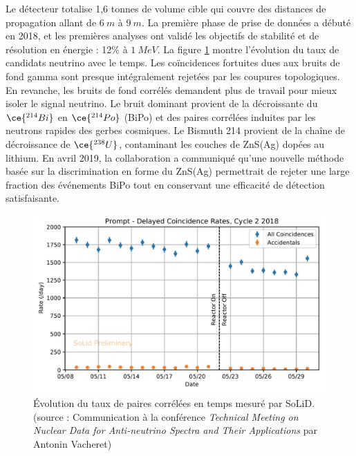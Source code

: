 Le détecteur totalise 1,6 tonnes de volume cible qui couvre des distances de propagation allant de $\SI{6}{m}$ à $\SI{9}{m}$. La première phase de prise de données a débuté en 2018, et les premières analyses ont validé les objectifs de stabilité et de résolution en énergie : 12\% à $\SI{1}{MeV}$. La figure \ref{fig:Solid_signal.png} montre l'évolution du taux de candidats neutrino avec le temps. Les coïncidences fortuites dues aux bruits de fond gamma sont presque intégralement rejetées par les coupures topologiques. En revanche, les bruits de fond corrélés demandent plus de travail pour mieux isoler le signal neutrino. Le bruit dominant provient de la décroissante du $\ce{^{214}Bi}$ en $\ce{^{214}Po}$ (BiPo) et des paires corrélées induites par les neutrons rapides des gerbes cosmiques. Le Bismuth 214 provient de la chaîne de décroissance de $\ce{^{238}U}$, contaminant les couches de ZnS(Ag) dopées au lithium. En avril 2019, la collaboration a communiqué qu'une nouvelle méthode basée sur la discrimination en forme du ZnS(Ag) permettrait de rejeter une large fraction des événements BiPo tout en conservant une efficacité de détection satisfaisante.

\bigbreak

\begin{figure}[h!]
  \centering
  \includegraphics[width=0.8\linewidth]{images/Solid_signal.png}
  \caption[Évolution du taux de paires corrélées en temps mesuré par SoLiD]{Évolution du taux de paires corrélées en temps mesuré par SoLiD. (source : Communication à la conférence \textit{Technical Meeting on Nuclear Data for Anti-neutrino Spectra and Their Applications} par Antonin Vacheret)}
  \label{fig:Solid_signal.png}
\end{figure}

%

